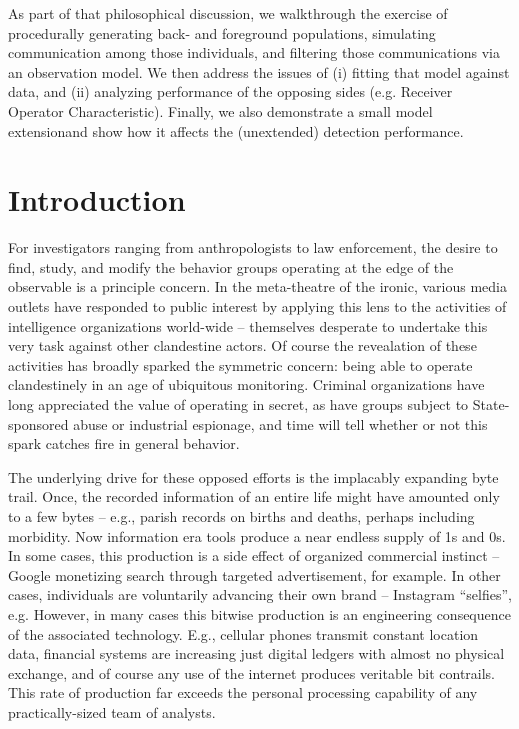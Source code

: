 \documentclass{article}
\newcommand{\todoCP}[1]{\todo{CP, #1}}
\begin{document}
As part of that philosophical discussion, we walkthrough the exercise of procedurally generating back- and foreground populations, simulating communication among those individuals, and filtering those communications via an observation model.  We then address the issues of (i) fitting that model against data, and (ii) analyzing performance of the opposing sides (e.g. Receiver Operator Characteristic).  Finally, we also demonstrate a small model extensionand show how it affects the (unextended) detection performance.


\newpage

\section*{Introduction}
For investigators ranging from anthropologists to law enforcement, the desire to find, study, and modify the behavior groups operating at the edge of the observable is a principle concern.  In the meta-theatre of the ironic, various media outlets have responded to public interest by applying this lens to the activities of intelligence organizations world-wide -- themselves desperate to undertake this very task against other clandestine actors.  Of course the revealation of these activities has broadly sparked the symmetric concern: being able to operate clandestinely in an age of ubiquitous monitoring.  Criminal organizations have long appreciated the value of operating in secret, as have groups subject to State-sponsored abuse or industrial espionage, and time will tell whether or not this spark catches fire in general behavior.

The underlying drive for these opposed efforts is the implacably expanding byte trail.  Once, the recorded information of an entire life might have amounted only to a few bytes -- e.g., parish records on births and deaths, perhaps including morbidity.  Now information era tools produce a near endless supply of 1s and 0s.  In some cases, this production is a side effect of organized commercial instinct -- Google monetizing search through targeted advertisement, for example.  In other cases, individuals are voluntarily advancing their own brand -- Instagram ``selfies'', e.g.  However, in many cases this bitwise production is an engineering consequence of the associated technology.  E.g., cellular phones transmit constant location data, financial systems are increasing just digital ledgers with almost no physical exchange, and of course any use of the internet produces veritable bit contrails.  This rate of production far exceeds the personal processing capability of any practically-sized team of analysts.
\end{document}
